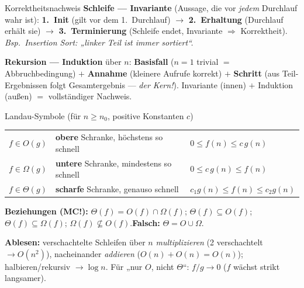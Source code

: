 \documentclass[10pt,a4paper]{article}
\begin{document}
\begin{defbox}{Korrektheitsnachweis}
\small
\textbf{Schleife — Invariante} (Aussage, die vor \emph{jedem} Durchlauf wahr ist):
\textbf{1.\ Init} (gilt vor dem 1.\ Durchlauf) $\to$ \textbf{2.\ Erhaltung} (Durchlauf erhält sie)
$\to$ \textbf{3.\ Terminierung} (Schleife endet, Invariante $\Rightarrow$ Korrektheit).
\emph{Bsp.\ Insertion Sort: „linker Teil ist immer sortiert``.}\par
\textbf{Rekursion — Induktion} über $n$: \textbf{Basisfall} ($n{=}1$ trivial $=$ Abbruchbedingung)
$+$ \textbf{Annahme} (kleinere Aufrufe korrekt) $+$ \textbf{Schritt} (aus Teil-Ergebnissen folgt
Gesamtergebnis — \emph{der Kern!}). Invariante (innen) $+$ Induktion (außen) $=$ vollständiger Nachweis.
\end{defbox}

\begin{defbox}{Landau-Symbole (für $n \ge n_0$, positive Konstanten $c$)}
\noindent
\begin{minipage}[c]{0.60\linewidth}\small
\renewcommand{\arraystretch}{1.25}
\begin{tabular}{@{}lll@{}}
$f \in O(g)$ & \textbf{obere} Schranke, höchstens so schnell & $0 \le f(n) \le c\,g(n)$ \\
$f \in \Omega(g)$ & \textbf{untere} Schranke, mindestens so schnell & $0 \le c\,g(n) \le f(n)$ \\
$f \in \Theta(g)$ & \textbf{scharfe} Schranke, genauso schnell & $c_1 g(n) \le f(n) \le c_2 g(n)$ \\
\end{tabular}
\par\vspace{2pt}
\textbf{Beziehungen (MC!):} $\Theta(f) = O(f) \cap \Omega(f)$;\quad
$\Theta(f) \subseteq O(f)$;\quad $\Theta(f) \subseteq \Omega(f)$;\quad
$\Omega(f) \not\subseteq O(f)$.\quad \textbf{Falsch:} $\Theta = O \cup \Omega$.
\par\vspace{2pt}
\textbf{Ablesen:} verschachtelte Schleifen über $n$ \emph{multiplizieren}
(2 verschachtelt $\to O(n^2)$), nacheinander \emph{addieren} ($O(n){+}O(n) = O(n)$);
halbieren/rekursiv $\to \log n$. Für „nur $O$, nicht $\Theta$``: $f/g \to 0$
($f$ wächst strikt langsamer).
\end{minipage}\hfill
\begin{minipage}[c]{0.37\linewidth}\centering
{}
\end{minipage}
\end{defbox}
\end{document}
